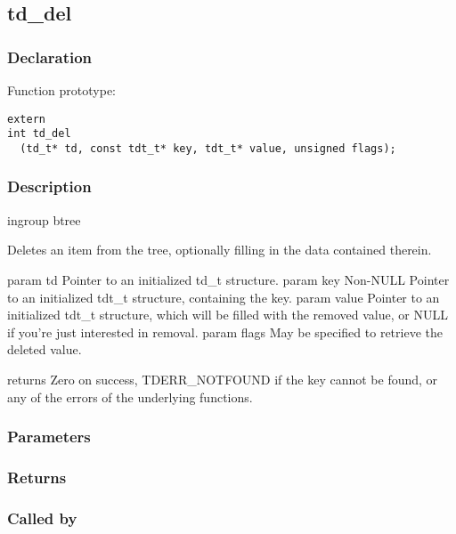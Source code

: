 
\newpage
\subsection{td\_del}
\subsubsection{Declaration} Function prototype:

\begin{verbatim}
extern
int td_del
  (td_t* td, const tdt_t* key, tdt_t* value, unsigned flags);
\end{verbatim}

\subsubsection{Description}


 ingroup btree

 Deletes an item from the tree, optionally filling in the data
 contained therein.

 param td Pointer to an initialized td\_t structure.
 param key Non-NULL Pointer to an initialized tdt\_t structure,
 containing the key.
 param value Pointer to an initialized tdt\_t structure, which will be filled
 with the removed value, or NULL if you're just interested in removal.
 param flags May be specified to retrieve the deleted value.

 returns Zero on success, TDERR\_NOTFOUND if the key cannot be found,
 or any of the errors of the underlying functions.
 

\subsubsection{Parameters}
\subsubsection{Returns}
\subsubsection{Called by}
